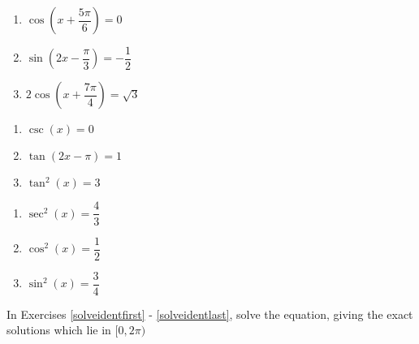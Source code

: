 \begin{multicols}{3}

\begin{enumerate}

\setcounter{enumi}{\value{HW}}

\item $\cos \left( x + \dfrac{5\pi}{6} \right) = 0$
\item $\sin \left( 2x - \dfrac{\pi}{3} \right) = -\dfrac{1}{2}$
\item $2\cos \left( x + \dfrac{7\pi}{4} \right) = \sqrt{3}$

\setcounter{HW}{\value{enumi}}

\end{enumerate}

\end{multicols}

\begin{multicols}{3}

\begin{enumerate}

\setcounter{enumi}{\value{HW}}

\item $\csc(x) = 0$
\item $\tan \left( 2x - \pi \right) = 1$
\item $\tan^{2} \left( x \right) = 3$

\setcounter{HW}{\value{enumi}}

\end{enumerate}

\end{multicols}

\begin{multicols}{3}

\begin{enumerate}

\setcounter{enumi}{\value{HW}}

\item $\sec^{2} \left( x \right) = \dfrac{4}{3}$
\item $\cos^{2} \left( x \right) = \dfrac{1}{2}$
\item $\sin^{2} \left( x \right) = \dfrac{3}{4}$ \label{solvebasiclast}

\setcounter{HW}{\value{enumi}}

\end{enumerate}

\end{multicols}

In Exercises \ref{solveidentfirst} - \ref{solveidentlast}, solve the equation, giving the exact solutions which lie in $[0, 2\pi)$

